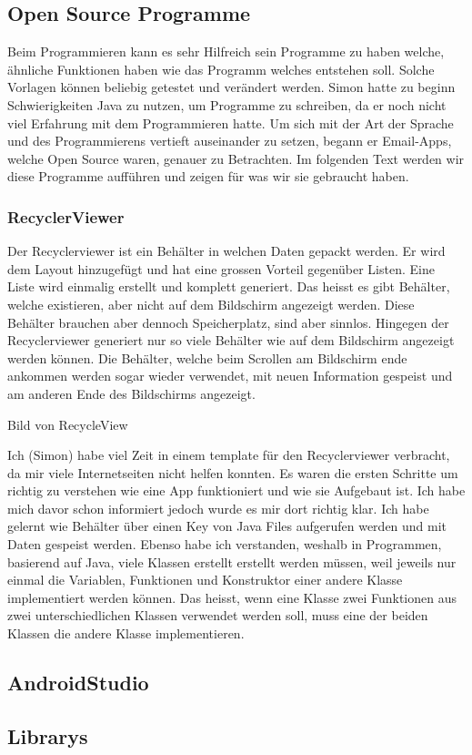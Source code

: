 \documentclass[a4paper,11pt]{article}
\begin{document}
\subsection{Open Source Programme}

Beim Programmieren kann es sehr Hilfreich sein Programme zu haben welche, ähnliche Funktionen haben wie das Programm welches entstehen soll. 
Solche Vorlagen können beliebig getestet und verändert werden. Simon hatte zu beginn Schwierigkeiten Java zu nutzen, um Programme zu schreiben, da er noch nicht viel 
Erfahrung mit dem Programmieren hatte. Um sich mit der Art der Sprache und des Programmierens vertieft auseinander zu setzen, begann er Email-Apps, welche Open Source
waren, genauer zu Betrachten. Im folgenden Text werden wir diese Programme aufführen und zeigen für was wir sie gebraucht haben. 


\subsubsection{RecyclerViewer}

Der Recyclerviewer ist ein Behälter in welchen Daten gepackt werden. Er wird dem Layout hinzugefügt und hat eine grossen Vorteil gegenüber Listen. 
Eine Liste wird einmalig erstellt und komplett generiert. Das heisst es gibt Behälter, welche existieren, aber nicht auf dem Bildschirm angezeigt werden. 
Diese Behälter brauchen aber dennoch Speicherplatz, sind aber sinnlos. Hingegen der Recyclerviewer generiert nur so viele Behälter wie auf dem Bildschirm angezeigt werden können. 
Die Behälter, welche beim Scrollen am Bildschirm ende ankommen werden sogar wieder verwendet, mit neuen Information gespeist und am anderen Ende des Bildschirms angezeigt.

Bild von RecycleView

Ich (Simon) habe viel Zeit in einem template für den Recyclerviewer verbracht, da mir viele Internetseiten nicht helfen konnten. Es waren die ersten Schritte um 
richtig zu verstehen wie eine App funktioniert und wie sie Aufgebaut ist. Ich habe mich davor schon informiert jedoch wurde es mir dort richtig klar. Ich habe gelernt
wie Behälter über einen Key von Java Files aufgerufen werden und mit Daten gespeist werden. Ebenso habe ich verstanden, weshalb in Programmen, basierend auf Java, viele 
Klassen erstellt erstellt werden müssen, weil jeweils nur einmal die Variablen, Funktionen und Konstruktor einer andere Klasse implementiert werden können. Das heisst, 
wenn eine Klasse zwei Funktionen aus zwei unterschiedlichen Klassen verwendet werden soll, muss eine der beiden Klassen die andere Klasse implementieren. 




\subsection{AndroidStudio}
\subsection{Librarys}
\end{document}

